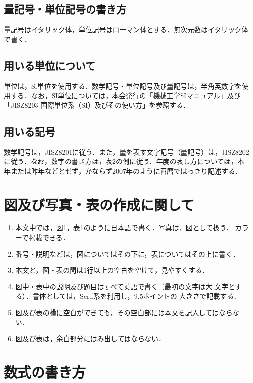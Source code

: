 \documentclass[a4paper, 10pt, dvips, fleqn]{jsarticle}
\begin{document}
\subsection{量記号・単位記号の書き方}

量記号はイタリック体，単位記号はローマン体とする．無次元数はイタリック体
で書く．

\subsection{用いる単位について}

単位は，SI単位を使用する．数学記号・単位記号及び量記号は，半角英数字を使
用する．なお，SI単位については，本会発行の「機械工学SIマニュアル」及び
「JISZ8203 国際単位系（SI）及びその使い方」を参照する． 

\subsection{用いる記号}

数学記号は，JISZ8201に従う．また，量を表す文字記号（量記号）は，JISZ8202
に従う．なお，数字の書き方は，表2の例に従う．年度の表し方については，本
年または昨年などとせず，かならず2007年のように西暦ではっきり記述する． 


\section{図及び写真・表の作成に関して}

\begin{enumerate}[(1)]
 \item 本文中では，図1，表1のように日本語で書く．写真は，図として扱う．
       カラーで掲載できる．
 \item 番号・説明などは，図についてはその下に，表についてはその上に書く．
 \item 本文と，図・表の間は1行以上の空白を空けて，見やすくする．
 \item 図中・表中の説明及び題目はすべて英語で書く（最初の文字は大
       文字とする）．書体としては，Serif系を利用し，9.5ポイントの
       大きさで記載する．
\item 図及び表の横に空白ができても，その空白部には本文を記入してはならな
      い．
 \item 図及び表は，余白部分にはみ出してはならない．
\end{enumerate}

\section{数式の書き方}
\end{document}
